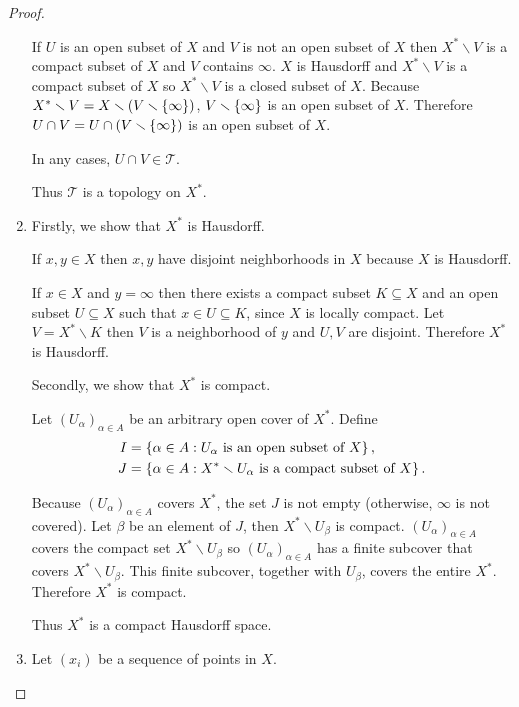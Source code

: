 \begin{proof}
\begin{enumerate}[label={(\alph*)}]
		      If $U$ is an open subset of $X$ and $V$ is not an open subset of $X$ then $X^{*}\smallsetminus V$ is a compact subset of $X$ and $V$ contains $\infty$. $X$ is Hausdorff and $X^{*}\smallsetminus V$ is a compact subset of $X$ so $X^{*}\smallsetminus V$ is a closed subset of $X$. Because $X^{*}\smallsetminus V = X\smallsetminus (V\smallsetminus \left\{{\infty}\right\})$, $V\smallsetminus \left\{{\infty}\right\}$ is an open subset of $X$. Therefore $U\cap V = U \cap (V\smallsetminus \left\{{\infty}\right\})$ is an open subset of $X$.

		      In any cases, $U\cap V \in \mathscr{T}$.

		      Thus $\mathscr{T}$ is a topology on $X^{*}$.
		\item Firstly, we show that $X^{*}$ is Hausdorff.

		      If $x, y \in X$ then $x, y$ have disjoint neighborhoods in $X$ because $X$ is Hausdorff.

		      If $x\in X$ and $y = \infty$ then there exists a compact subset $K\subseteq X$ and an open subset $U\subseteq X$ such that $x\in U\subseteq K$, since $X$ is locally compact. Let $V = X^{*}\smallsetminus K$ then $V$ is a neighborhood of $y$ and $U, V$ are disjoint. Therefore $X^{*}$ is Hausdorff.

		      Secondly, we show that $X^{*}$ is compact.

		      Let ${(U_{\alpha})}_{\alpha\in A}$ be an arbitrary open cover of $X^{*}$. Define
		      \begin{align*}
			      I & = \left\{{\alpha \in A : \text{$U_{\alpha}$ is an open subset of $X$}}\right\},                       \\
			      J & = \left\{{\alpha \in A : \text{$X^{*}\smallsetminus U_{\alpha}$ is a compact subset of $X$}}\right\}.
		      \end{align*}

		      Because ${(U_{\alpha})}_{\alpha\in A}$ covers $X^{*}$, the set $J$ is not empty (otherwise, $\infty$ is not covered). Let $\beta$ be an element of $J$, then $X^{*}\smallsetminus U_{\beta}$ is compact. ${(U_{\alpha})}_{\alpha\in A}$ covers the compact set $X^{*}\smallsetminus U_{\beta}$ so ${(U_{\alpha})}_{\alpha\in A}$ has a finite subcover that covers $X^{*}\smallsetminus U_{\beta}$. This finite subcover, together with $U_{\beta}$, covers the entire $X^{*}$. Therefore $X^{*}$ is compact.

		      Thus $X^{*}$ is a compact Hausdorff space.
		\item Let ${(x_{i})}$ be a sequence of points in $X$.


\end{enumerate}
\end{proof}
